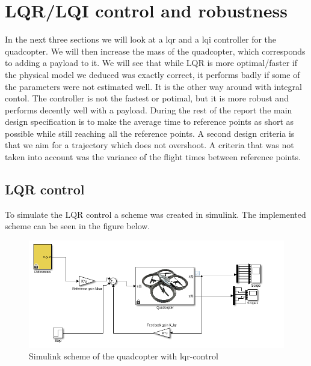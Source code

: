 \documentclass[]{article}
\begin{document}
\section{LQR/LQI control and robustness}
In the next three sections we will look at a lqr and a lqi controller for the quadcopter. We will then increase the mass of the quadcopter, which corresponds to adding a payload to it. We will see that while LQR is more optimal/faster if the physical model we deduced was exactly correct, it performs badly if some of the parameters were not estimated well. It is the other way around with integral contol. The controller is not the fastest or potimal, but  it is more robust and performs decently well with a payload. During the rest of the report the main design specification is to make the average time to reference points as short as possible while still reaching all the reference points. A second design criteria is that we aim for a trajectory which does not overshoot. A criteria that was not taken into account was the variance of the flight times between reference points. 

\subsection{LQR control}
To simulate the LQR control a scheme was created in simulink. The implemented scheme can be seen in the figure below. 

\begin{figure}[H]
\centering
\includegraphics[width=.9\textwidth]{lqrscheme.png}
\caption{Simulink scheme of the quadcopter with lqr-control}
\end{figure}
\end{document}
